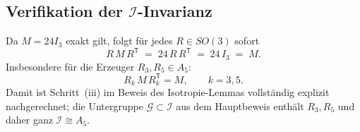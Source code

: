\documentclass[11pt,a4paper]{article}
\begin{document}
	\subsection{Verifikation der $\mathcal{I}$-Invarianz}
	
	Da $M=24I_3$ exakt gilt, folgt für jedes $R\in SO(3)$ sofort
	\[
	R\,M\,R^{\mathsf T}
	\;=\;
	24\,R\,R^{\mathsf T}
	\;=\;
	24\,I_3
	\;=\;
	M.
	\]
	Insbesondere für die Erzeuger $R_3,R_5\in A_5$:
	\[
	R_k\,M\,R_k^{\mathsf T} = M,
	\qquad k=3,5.
	\]
	Damit ist Schritt~(iii) im Beweis des Isotropie-Lemmas vollständig explizit
	nachgerechnet; die Untergruppe $\mathcal{G}\subset\mathcal{I}$ aus dem
	Hauptbeweis enthält $R_3,R_5$ und daher ganz $\mathcal{I}\cong A_5$.
	
	
	
	
\end{document}

